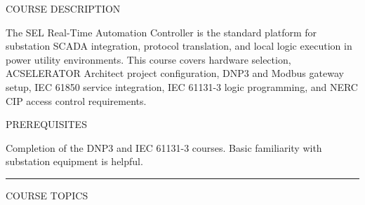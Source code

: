 \documentclass[10pt]{article}
\begin{document}

\vspace{0.70in}

{\small\sffamily\color{rgray}\MakeUppercase{Course Description}}
\smallskip

{\small The SEL Real-Time Automation Controller is the standard platform for substation SCADA integration, protocol translation, and local logic execution in power utility environments. This course covers hardware selection, ACSELERATOR Architect project configuration, DNP3 and Modbus gateway setup, IEC 61850 service integration, IEC 61131-3 logic programming, and NERC CIP access control requirements.}

\smallskip
{\small\sffamily\color{rgray}\MakeUppercase{Prerequisites}}
\smallskip

{\small Completion of the DNP3 and IEC 61131-3 courses. Basic familiarity with substation equipment is helpful.}

\smallskip
{\color{rnavy}\rule{\linewidth}{1.2pt}}
\smallskip
{\small\sffamily\color{rgray}\MakeUppercase{Course Topics}}
\smallskip
\end{document}
